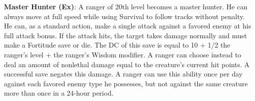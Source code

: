 \textbf{Master Hunter (Ex)}: A ranger of 20th level becomes a master hunter. He can always move at full speed while using Survival to follow tracks without penalty. He can, as a standard action, make a single attack against a favored enemy at his full attack bonus. If the attack hits, the target takes damage normally and must make a Fortitude save or die. The DC of this save is equal to 10 + 1/2 the ranger's level + the ranger's Wisdom modifier. A ranger can choose instead to deal an amount of nonlethal damage equal to the creature's current hit points. A successful save negates this damage. A ranger can use this ability once per day against each favored enemy type he possesses, but not against the same creature more than once in a 24-hour period.
        	
